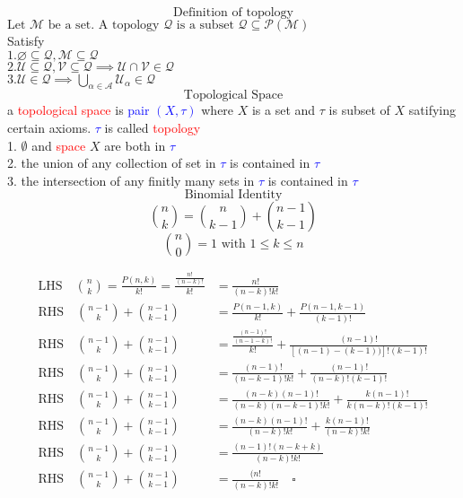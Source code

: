 \documentclass{book}
\begin{document}
\newpage
\noindent
\[\text{Definition of topology}\]
$\text{Let }\mathcal{M} \text{ be a set. A topology }\mathcal{Q} \text{ is a subset } \mathcal{Q} \subseteq \mathcal{P}(\mathcal{M})$\\
Satisfy\\
$1. \varnothing\subseteq \mathcal{Q}, \mathcal{M} \subseteq \mathcal{Q}$\\
$2. \mathcal{U} \subseteq \mathcal{Q},   \mathcal{V} \subseteq \mathcal{Q} \implies \mathcal{U} \cap \mathcal{V} \in \mathcal{Q}$\\
$3. \mathcal{U} \in \mathcal{Q} \implies \bigcup_{\alpha \in \mathcal{A}} \mathcal{U}_\alpha \in \mathcal{Q}$\\

\noindent
\[\text{Topological Space}\]
a \textcolor{red}{topological space} is \textcolor{blue}{pair $(X, \tau)$} where $X$ is a set and $\tau$ is subset of $X$ satifying certain axioms. \textcolor{blue}{$\tau$} is called \textcolor{red}{topology}\\
1. $\emptyset$ and \textcolor{red}{space} $X$ are both in \textcolor{blue}{$\tau$}\\
2. the union of any collection of set in \textcolor{blue}{$\tau$} is contained in \textcolor{blue}{$\tau$}\\
3. the intersection of any finitly many sets in \textcolor{blue}{$\tau$} is contained in \textcolor{blue}{$\tau$}\\

\[ \text{Binomial Identity} \] 
\[  \binom{n}{k} = \binom{n}{k-1} + \binom{n-1}{k-1} \] 
\[ \binom{n}{0} = 1 \text{ with } 1 \leq k \leq n\] 

\begin{equation}
\begin{aligned}
    \text{LHS} \quad \binom{n}{k} = \frac{P(n, k)}{k!} = \frac{\frac{n!}{(n-k)!}}{k!} &= \frac{n!}{(n-k)! k!}\\
    \text{RHS} \quad \binom{n-1}{k} + \binom{n-1}{k-1} &= \frac{P(n-1, k)}{k!} + \frac{P(n-1, k-1)}{(k-1)!}  \\  
    \text{RHS} \quad \binom{n-1}{k} + \binom{n-1}{k-1} &= \frac{\frac{(n-1)!}{(n-1-k)!}}{k!} + \frac{(n-1)!}{[(n-1)-(k-1))]!(k-1)!}\\    
    \text{RHS} \quad \binom{n-1}{k} + \binom{n-1}{k-1} &= \frac{(n-1)!}{(n-k-1)!k!} + \frac{(n-1)!}{(n-k)!(k-1)!}\\    
    \text{RHS} \quad \binom{n-1}{k} + \binom{n-1}{k-1} &= \frac{(n-k)(n-1)!}{(n-k)(n-k-1)!k!} + \frac{k(n-1)!}{k(n-k)!(k-1)!}\\    
    \text{RHS} \quad \binom{n-1}{k} + \binom{n-1}{k-1} &= \frac{(n-k)(n-1)!}{(n-k)!k!} + \frac{k(n-1)!}{(n-k)!k!}\\    
    \text{RHS} \quad \binom{n-1}{k} + \binom{n-1}{k-1} &= \frac{(n-1)!(n-k+k)}{(n-k)!k!}\\    
    \text{RHS} \quad \binom{n-1}{k} + \binom{n-1}{k-1} &= \frac{(n!}{(n-k)!k!} \nonumber \quad \square\\    
\end{aligned}
\end{equation}
\end{document}
